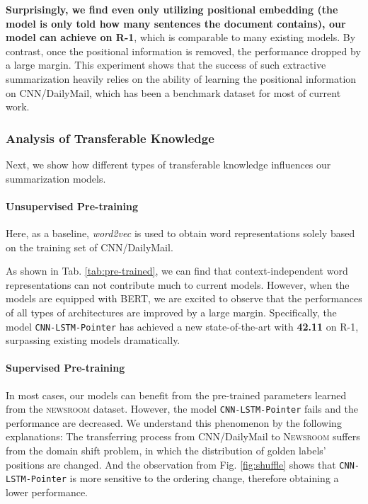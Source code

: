 \documentclass[11pt,a4paper]{article}
\begin{document}
\textbf{Surprisingly, we find even only utilizing positional embedding (the model is only told how many sentences the document contains), our model can achieve  on R-1}, which is comparable to many existing models.
By contrast, once the positional information is removed, the performance dropped by a large margin.
This experiment shows that the success of such extractive summarization heavily relies on the ability of learning the positional information on CNN/DailyMail, which has been a benchmark dataset for most of current work.






\subsubsection{Analysis of Transferable Knowledge} \label{eq:knowledge}
Next, we show how different types of transferable knowledge influences our summarization models.



\paragraph{Unsupervised Pre-training}
Here, as a baseline, \textit{word2vec} is used to obtain word representations solely based on the training set of CNN/DailyMail.

As shown in Tab. \ref{tab:pre-trained}, we can find that context-independent word representations can not contribute much to current models.
However, when the models are equipped with BERT, we are excited to observe that the performances of all types of architectures are improved by a large margin.
Specifically, the model  \texttt{CNN-LSTM-Pointer} has achieved a new state-of-the-art with \textbf{42.11} on R-1, surpassing existing models dramatically.



\paragraph{Supervised Pre-training}
In most cases, our models can benefit from the pre-trained parameters learned from the \textsc{newsroom} dataset. However, the model \texttt{CNN-LSTM-Pointer} fails and the performance are decreased.
We understand this phenomenon by the following explanations:
The transferring process from CNN/DailyMail to \textsc{Newsroom} suffers from the domain shift problem, in which the distribution of golden labels' positions are changed. And the observation from Fig. \ref{fig:shuffle} shows that \texttt{CNN-LSTM-Pointer} is more sensitive to the ordering change, therefore obtaining a lower performance.
\end{document}
